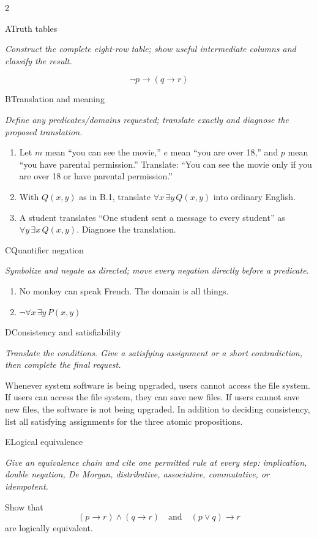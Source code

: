 \documentclass[9pt]{extarticle}
\begin{document}
\CoreWorkArea
\FormBreak
{}
\begin{multicols}{2}
\begin{CoreProblem}{A}{Truth tables}
{\scriptsize\textit{Construct the complete eight-row table; show useful intermediate columns and classify the result.}\par}
\[
  \neg p\to(q\to r)
\]
\end{CoreProblem}
\begin{CoreProblem}{B}{Translation and meaning}
{\scriptsize\textit{Define any predicates/domains requested; translate exactly and diagnose the proposed translation.}\par}
\begin{enumerate}[label=(\alph*)]
  \item Let $m$ mean ``you can see the movie,'' $e$ mean ``you are over 18,''
        and $p$ mean ``you have parental permission.'' Translate: ``You can
        see the movie only if you are over 18 or have parental permission.''
  \item With $Q(x,y)$ as in B.1, translate $\forall x\,\exists y\,Q(x,y)$
        into ordinary English.
  \item A student translates ``One student sent a message to every student''
        as $\forall y\,\exists x\,Q(x,y)$. Diagnose the translation.
\end{enumerate}
\end{CoreProblem}
\begin{CoreProblem}{C}{Quantifier negation}
{\scriptsize\textit{Symbolize and negate as directed; move every negation directly before a predicate.}\par}
\begin{enumerate}[label=(\alph*)]
  \item No monkey can speak French. The domain is all things.
  \item $\neg\forall x\,\exists y\,P(x,y)$
\end{enumerate}
\end{CoreProblem}
\columnbreak
\begin{CoreProblem}{D}{Consistency and satisfiability}
{\scriptsize\textit{Translate the conditions. Give a satisfying assignment or a short contradiction, then complete the final request.}\par}
Whenever system software is being upgraded, users cannot access the file
system. If users can access the file system, they can save new files. If users
cannot save new files, the software is not being upgraded. In addition to
deciding consistency, list all satisfying assignments for the three atomic
propositions.
\end{CoreProblem}
\begin{CoreProblem}{E}{Logical equivalence}
{\scriptsize\textit{Give an equivalence chain and cite one permitted rule at every step: implication, double negation, De Morgan, distributive, associative, commutative, or idempotent.}\par}
Show that
\[
  (p\to r)\land(q\to r)
  \quad\text{and}\quad
  (p\lor q)\to r
\]
are logically equivalent.
\end{CoreProblem}
\end{multicols}
\end{document}
